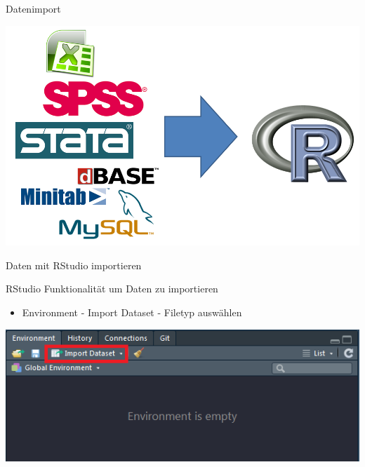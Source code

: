 \documentclass[ignorenonframetext,]{beamer}
\providecommand{\tightlist}{%
  \setlength{\itemsep}{0pt}\setlength{\parskip}{0pt}}
\begin{document}
\begin{frame}{Datenimport}
\protect\hypertarget{datenimport}{}

\includegraphics{figure/Datenimport.PNG}

\end{frame}

\begin{frame}{Daten mit RStudio importieren}
\protect\hypertarget{daten-mit-rstudio-importieren}{}

\begin{block}{RStudio Funktionalität um Daten zu importieren}

\begin{itemize}
\tightlist
\item
  Environment - Import Dataset - Filetyp auswählen
\end{itemize}

\includegraphics{figure/rstudio_import.PNG}

\end{block}

\end{frame}
\end{document}
